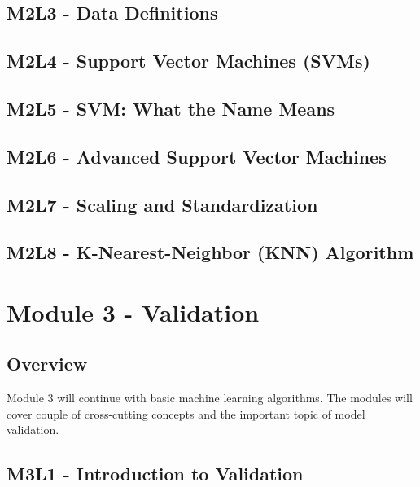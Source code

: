 \documentclass[
]{book}
\begin{document}
\section{M2L3 - Data Definitions}\label{m2l3---data-definitions}

\section{M2L4 - Support Vector Machines (SVMs)}\label{m2l4---support-vector-machines-svms}

\section{M2L5 - SVM: What the Name Means}\label{m2l5---svm-what-the-name-means}

\section{M2L6 - Advanced Support Vector Machines}\label{m2l6---advanced-support-vector-machines}

\section{M2L7 - Scaling and Standardization}\label{m2l7---scaling-and-standardization}

\section{M2L8 - K-Nearest-Neighbor (KNN) Algorithm}\label{m2l8---k-nearest-neighbor-knn-algorithm}

\chapter{Module 3 - Validation}\label{module-3---validation}

\section{Overview}\label{overview}

Module 3 will continue with basic machine learning algorithms.
The modules will cover couple of cross-cutting concepts and the important topic of model validation.

\section{M3L1 - Introduction to Validation}\label{m3l1---introduction-to-validation}
\end{document}
